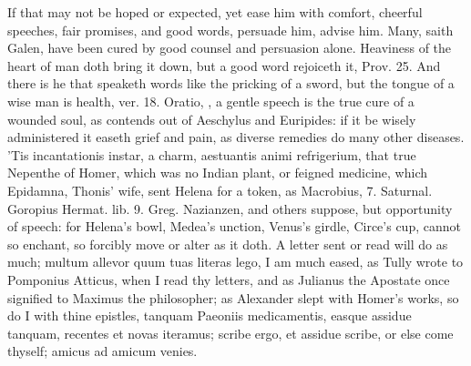 {If that may not be hoped or expected, yet ease him with comfort,
cheerful speeches, fair promises, and good words, persuade him, advise
him. Many, saith Galen, have been cured by good counsel and
persuasion alone. Heaviness of the heart of man doth bring it down, but
a good word rejoiceth it, Prov.  25. And there is he that speaketh
words like the pricking of a sword, but the tongue of a wise man is
health, ver. 18. Oratio, , a gentle
speech is the true cure of a wounded soul, as \Plutarch contends
out of Aeschylus and Euripides: if it be wisely administered it easeth
grief and pain, as diverse remedies do many other diseases. 'Tis
incantationis instar, a charm, aestuantis animi refrigerium, that true
Nepenthe of Homer, which was no Indian plant, or feigned medicine,
which Epidamna, Thonis' wife, sent Helena for a token, as Macrobius, 7.
Saturnal. Goropius Hermat. lib. 9. Greg. Nazianzen, and others suppose,
but opportunity of speech: for Helena's bowl, Medea's unction, Venus's
girdle, Circe's cup, cannot so enchant, so forcibly move or alter as it
doth. A letter sent or read will do as much; multum allevor quum tuas
literas lego, I am much eased, as Tully wrote to Pomponius
Atticus, when I read thy letters, and as Julianus the Apostate once
signified to Maximus the philosopher; as Alexander slept with Homer's
works, so do I with thine epistles, tanquam Paeoniis medicamentis,
easque assidue tanquam, recentes et novas iteramus; scribe ergo, et
assidue scribe, or else come thyself; amicus ad amicum venies.

}
